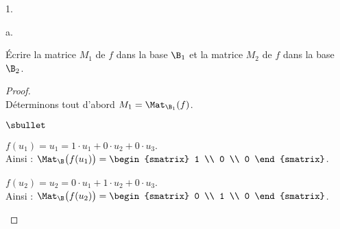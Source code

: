 \documentclass[11pt]{article}%
\begin{document}
\newpage


\begin{noliste}{1.}
  \setlength{\itemsep}{4mm} %
  \setcounter{enumi}{6}
\item
  \begin{noliste}{a.}
    \setlength{\itemsep}{2mm} %
  \item Écrire la matrice $M_1$ de $f$ dans la base $\B_1$ et la
    matrice $M_2$ de $f$ dans la base $\B_2$.
    
    \begin{proof}~\\%
      Déterminons tout d'abord $M_1 = \Mat_{\B_1}(f)$.
      \begin{noliste}{$\sbullet$}
      \item $f(u_1) = u_1 = 1 \cdot u_1 + 0 \cdot u_2 + 0 \cdot u_3$.\\[.1cm]
        Ainsi : $\Mat_{\B}\big( f(u_1) \big) =
        \begin{smatrix}
          1 \\
          0 \\
          0
        \end{smatrix}
        $.
        
      \item $f(u_2) = u_2 = 0 \cdot u_1 + 1 \cdot u_2 + 0 \cdot u_3$.\\[.1cm]
        Ainsi : $\Mat_{\B}\big( f(u_2) \big) =
        \begin{smatrix}
          0 \\
          1 \\
          0
        \end{smatrix}
        $.
        

\end{noliste}
\end{proof}
\end{noliste}
\end{noliste}
\end{document}
